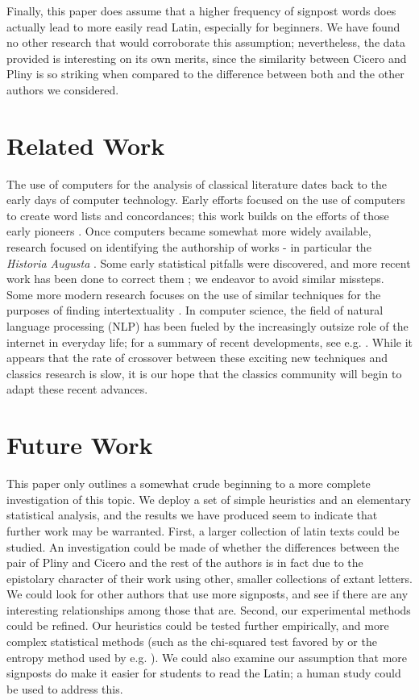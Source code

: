 Finally, this paper does assume that a higher frequency of signpost words does actually lead to more easily read Latin, especially for beginners. We have found no other research that would corroborate this assumption; nevertheless, the data provided is interesting on its own merits, since the similarity between Cicero and Pliny is so striking when compared to the difference between both and the other authors we considered.

\section{Related Work}
\label{sec:related}

The use of computers for the analysis of classical literature dates back to the early days of computer technology. Early efforts focused on the use of computers to create word lists and concordances; this work builds on the efforts of those early pioneers \cite{early}. Once computers became somewhat more widely available, research focused on identifying the authorship of works - in particular the \textit{Historia Augusta} \cite{marriott}. Some early statistical pitfalls were discovered, and more recent work has been done to correct them \cite{sansone} \cite{purple}; we endeavor to avoid similar missteps. Some more modern research focuses on the use of similar techniques for the purposes of finding intertextuality \cite{forstall}. In computer science, the field of natural language processing (NLP) has been fueled by the increasingly outsize role of the internet in everyday life; for a summary of recent developments, see e.g. \cite{nlp}. While it appears that the rate of crossover between these exciting new techniques and classics research is slow, it is our hope that the classics community will begin to adapt these recent advances.

\section{Future Work}
\label{sec:Future}

This paper only outlines a somewhat crude beginning to a more complete investigation of this topic. We deploy a set of simple heuristics and an elementary statistical analysis, and the results we have produced seem to indicate that further work may be warranted. First, a larger collection of latin texts could be studied. An investigation could be made of whether the differences between the pair of Pliny and Cicero and the rest of the authors is in fact due to the epistolary character of their work using other, smaller collections of extant letters. We could look for other authors that use more signposts, and see if there are any interesting relationships among those that are. Second, our experimental methods could be refined. Our heuristics could be tested further empirically, and more complex statistical methods (such as the chi-squared test favored by \cite{chi2} or the entropy method used by e.g. \cite{software}). We could also examine our assumption that more signposts do make it easier for students to read the Latin; a human study could be used to address this.


